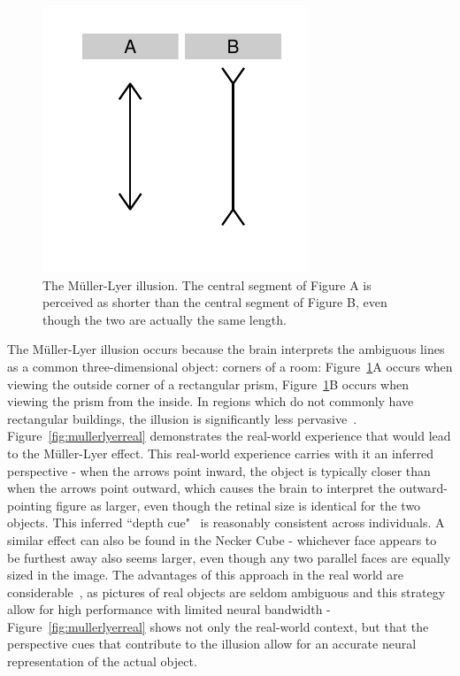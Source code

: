 \documentclass[journal]{vgtc}\usepackage{graphicx, color}
\begin{document}
\begin{figure}[h!t]\centering
\includegraphics[keepaspectratio=TRUE]{figure/fig-mullerlyer}
\caption{The M\"uller-Lyer illusion. The central segment of Figure A is perceived as shorter than the central segment  of Figure B, even though the two are actually the same length.}\label{fig:mullerlyer}
\end{figure}

The M\"uller-Lyer illusion occurs because the brain interprets the ambiguous lines as a common three-dimensional object: corners of a room: Figure~\ref{fig:mullerlyer}A occurs when viewing the outside corner of a rectangular prism, Figure~\ref{fig:mullerlyer}B occurs when viewing the prism from the inside.  In regions which do not commonly have rectangular buildings, the illusion is significantly less pervasive~\citep{mullerlyerafrica}. Figure~\ref{fig:mullerlyerreal} demonstrates the real-world experience that would lead to the M\"uller-Lyer effect. This real-world experience carries with it an inferred perspective - when the arrows point inward, the object is typically closer than when the arrows point outward, which causes the brain to interpret the outward-pointing figure as larger, even though the retinal size is identical for the two objects. This inferred ``depth cue"~\citep{gregory} is reasonably consistent across individuals. A similar effect can also be found in the Necker Cube - whichever face appears to be furthest away also seems larger, even though any two parallel faces are equally sized in the image. The advantages of this approach in the real world are considerable~\citep{gregory}, as pictures of real objects are seldom ambiguous and this strategy allow for high performance with limited neural bandwidth - Figure~\ref{fig:mullerlyerreal} shows not only the real-world context, but that the perspective cues that contribute to the illusion allow for an accurate neural representation of the actual object. 
\end{document}
